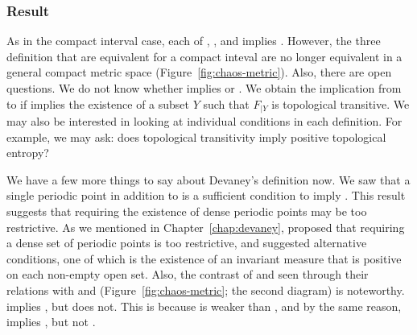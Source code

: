\documentclass[10pt,twoside,draft]{book}
\begin{document}
\subsubsection*{Result}
As in the compact interval case, each of \dev, \blcp, and \pte implies \liy.
However, the three definition that are equivalent for a compact inteval are no longer equivalent in a general compact metric space (Figure~\ref{fig:chaos-metric}).
Also, there are open questions.
We do not know whether \pte implies \blcp or \dev.
We obtain the implication from \pte to \wig if \pte implies the existence of a subset $Y$ such that $F_{|Y}$ is topological transitive.
We may also be interested in looking at individual conditions in each definition.
For example, we may ask: does topological transitivity imply positive topological entropy?

We have a few more things to say about Devaney's definition now.
We saw that a single periodic point in addition to \wig is a sufficient condition to imply \liy. 
This result suggests that requiring the existence of dense periodic points may be too restrictive.
As we mentioned in Chapter~\ref{chap:devaney}, \citet{glasner} proposed that requiring a dense set of periodic points is too restrictive, and suggested alternative conditions, one of which is the existence of an invariant measure that is positive on each non-empty open set.
Also, the contrast of \dev and \wig seen through their relations with \pte and \liy (Figure~\ref{fig:chaos-metric}; the second diagram) is noteworthy.
\dev implies \liy, but \wig does not.
This is because \wig is weaker than \dev, and by the same reason, \blcp implies \wig, but not \dev.




\printindex
\end{document}
